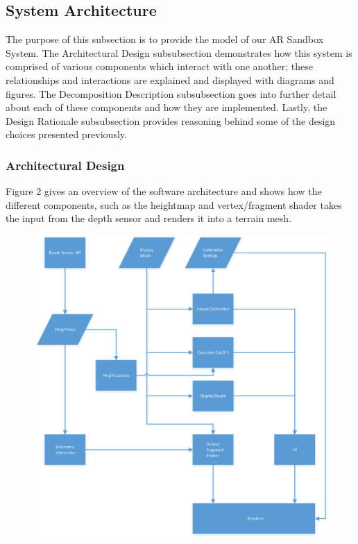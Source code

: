 \subsection{System Architecture}
The purpose of this subsection is to provide the model of our AR Sandbox System.  
The Architectural Design subsubsection demonstrates how this system is comprised of various components which interact with one another; these relationships and interactions are explained and displayed with diagrams and figures. 
The Decomposition Description subsubsection goes into further detail about each of these components and how they are implemented.
Lastly, the Design Rationale subsubsection provides reasoning behind some of the design choices presented previously.

\subsubsection{Architectural Design}
\par Figure 2 gives an overview of the software architecture and shows how the different components, such as the heightmap and vertex/fragment shader takes the input from the depth sensor and renders it into a terrain mesh.



\begin{figure}[H]
	\centering
	\includegraphics[width=6in]{SysArch}
    \label{fig:sysarchitecture}
\end{figure}


